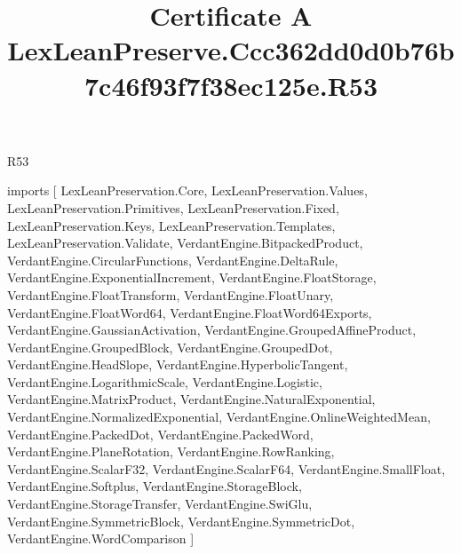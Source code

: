 \begin{lexlean}{R53}
\title{Certificate A LexLeanPreserve.Ccc362dd0d0b76b7c46f93f7f38ec125e.R53}
\begin{coremodule}
imports [
  LexLeanPreservation.Core,
  LexLeanPreservation.Values,
  LexLeanPreservation.Primitives,
  LexLeanPreservation.Fixed,
  LexLeanPreservation.Keys,
  LexLeanPreservation.Templates,
  LexLeanPreservation.Validate,
  VerdantEngine.BitpackedProduct,
  VerdantEngine.CircularFunctions,
  VerdantEngine.DeltaRule,
  VerdantEngine.ExponentialIncrement,
  VerdantEngine.FloatStorage,
  VerdantEngine.FloatTransform,
  VerdantEngine.FloatUnary,
  VerdantEngine.FloatWord64,
  VerdantEngine.FloatWord64Exports,
  VerdantEngine.GaussianActivation,
  VerdantEngine.GroupedAffineProduct,
  VerdantEngine.GroupedBlock,
  VerdantEngine.GroupedDot,
  VerdantEngine.HeadSlope,
  VerdantEngine.HyperbolicTangent,
  VerdantEngine.LogarithmicScale,
  VerdantEngine.Logistic,
  VerdantEngine.MatrixProduct,
  VerdantEngine.NaturalExponential,
  VerdantEngine.NormalizedExponential,
  VerdantEngine.OnlineWeightedMean,
  VerdantEngine.PackedDot,
  VerdantEngine.PackedWord,
  VerdantEngine.PlaneRotation,
  VerdantEngine.RowRanking,
  VerdantEngine.ScalarF32,
  VerdantEngine.ScalarF64,
  VerdantEngine.SmallFloat,
  VerdantEngine.Softplus,
  VerdantEngine.StorageBlock,
  VerdantEngine.StorageTransfer,
  VerdantEngine.SwiGlu,
  VerdantEngine.SymmetricBlock,
  VerdantEngine.SymmetricDot,
  VerdantEngine.WordComparison
]


\end{coremodule}
\end{lexlean}
